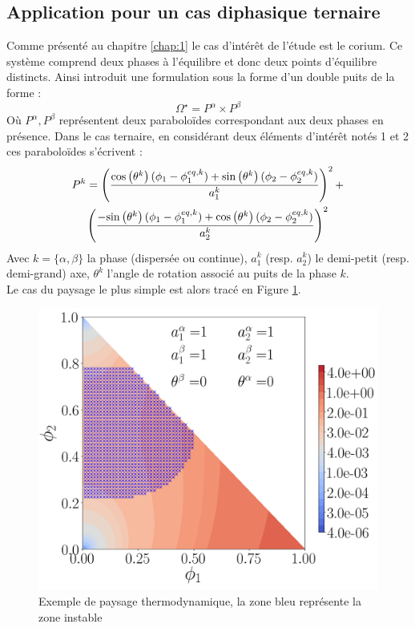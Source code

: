 	\subsection{Application pour un cas diphasique ternaire}
Comme présenté au chapitre \ref{chap:1} le cas d'intérêt de l'étude est le corium. Ce système comprend deux phases à l'équilibre et donc deux points d'équilibre distincts.  Ainsi \cite{rasolofomanana_numerical_nodate} introduit une formulation sous la forme d'un double puits de la forme :
\begin{equation}\label{double_puit}
	\Omega^{\star}  = P^{\alpha} \times P^{\beta}
\end{equation}
Où $P^{\alpha}, P^{\beta}$ représentent deux paraboloïdes correspondant aux deux phases en présence. Dans le cas ternaire, en considérant deux éléments d'intérêt notés 1 et 2 ces paraboloïdes s'écrivent :
\begin{multline}
P^{k}=\left(\frac{\text{cos}\left(\theta^{k}\right)(\phi_{1}-\phi_{1}^{eq,k}) + \text{sin}\left(\theta^{k}\right)(\phi_{2}-\phi_{2}^{eq,k})}{a_{1}^{k}}\right)^{2}+\\ \left(\frac{-\text{sin}\left(\theta^{k}\right)(\phi_{1}-\phi_{1}^{eq,k}) + \text{cos}\left(\theta^{k}\right)(\phi_{2}-\phi_{2}^{eq,k})}{a_{2}^{k}}\right)^{2}
\label{eq:paraboloid_general_}
\end{multline}
Avec $k = \{\alpha,\beta\}$ la phase (dispersée ou continue), $a_{1}^k$ (resp. $a_{2}^k$) le demi-petit  (resp. demi-grand) axe, $\theta^k$ l'angle de rotation associé au puits de la phase $k$.\\
Le cas du paysage le plus simple est alors tracé en Figure \ref{fig:landscape}.
\begin{figure}[H]
	\centering
	\includegraphics[width=0.6\linewidth]{figure/landscape}
	\caption{Exemple de paysage thermodynamique, la zone bleu représente la zone instable}
	\label{fig:landscape}
\end{figure}
